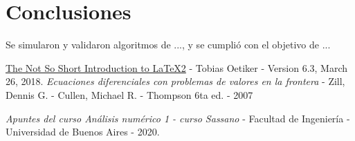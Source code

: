 \section{Conclusiones}

Se simularon y validaron algoritmos de ..., y se cumplió con el objetivo de ...

\clearpage
\begin{thebibliography}{10}
	\href{https://tobi.oetiker.ch/lshort/lshort-a5.pdf}{The Not So Short
		Introduction to \LaTeX 2} - Tobias Oetiker - Version 6.3, March 26, 2018.
	\emph{Ecuaciones diferenciales con problemas de valores en la frontera} - Zill, Dennis G. - Cullen, Michael R. - Thompson 6ta ed. - 2007
	
	\emph{Apuntes del curso Análisis numérico 1 - curso Sassano} - Facultad de Ingeniería - Universidad de Buenos Aires - 2020.
	
\end{thebibliography}


